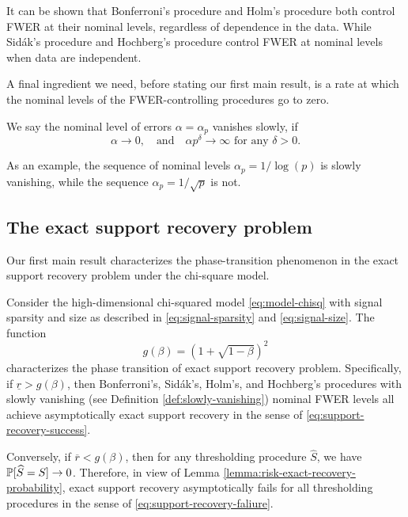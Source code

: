 It can be shown that Bonferroni's procedure and Holm's procedure both control FWER at their nominal levels, regardless of dependence in the data.
While Sid\'ak's procedure and Hochberg's procedure control FWER at nominal levels when data are independent.

A final ingredient we need, before stating our first main result, is a rate at which the nominal levels of the FWER-controlling procedures go to zero.
\begin{definition} \label{def:slowly-vanishing}
We say the nominal level of errors $\alpha = \alpha_p$ vanishes slowly, if
\begin{equation} \label{eq:slowly-vanishing-error}
    \alpha\to 0,\quad \text{and} \quad \alpha p^\delta\to\infty \text{  for any } \delta>0.
\end{equation}
\end{definition}
As an example, the sequence of nominal levels $\alpha_p = 1/\log{(p)}$ is slowly vanishing, while the sequence $\alpha_p = 1/\sqrt{p}$ is not.

\subsection{The exact support recovery problem}
\label{subsec:exact-support-recovery-boundary}

Our first main result characterizes the phase-transition phenomenon in the exact support recovery problem under the chi-square model.

\begin{theorem} \label{thm:chi-squared-exact-boundary}
Consider the high-dimensional chi-squared model \eqref{eq:model-chisq} with signal sparsity and size as described in \eqref{eq:signal-sparsity} and \eqref{eq:signal-size}.
The function 
\begin{equation} \label{eq:exact-boundary-chisquared}
    g(\beta) = \left(1 + \sqrt{1-\beta}\right)^2
\end{equation}
characterizes the phase transition of exact support recovery problem.
Specifically, if $\underline{r} > {{g}}(\beta)$, then Bonferroni's, Sid\'ak's, Holm's, and Hochberg's procedures with slowly vanishing (see Definition \ref{def:slowly-vanishing}) nominal FWER levels all achieve asymptotically exact support recovery in the sense of \eqref{eq:support-recovery-success}. 

Conversely, if $\overline{r} < {{g}}(\beta)$, then for any thresholding procedure $\widehat{S}$, we have $\P[\widehat{S}=S]\to0$.
Therefore, in view of Lemma \ref{lemma:risk-exact-recovery-probability}, exact support recovery asymptotically fails for all thresholding procedures in the sense of \eqref{eq:support-recovery-faliure}.
\end{theorem}

